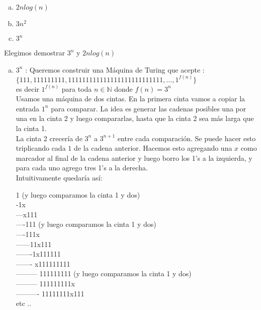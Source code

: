 \documentclass[12pt,letterpaper]{article}
\begin{document}
\begin{enumerate}[a.]
    \item $2n log(n)$ 
    \item $3n^2$
    \item $3^n$
\end{enumerate}

Elegimos demostrar $3^{n}$ y $2n log(n)$

    \begin{enumerate}[a.]
       
        \item $3^n$ : Queremos construir una Máquina de Turing que acepte : \\
        
        $\{111, 111111111, 111111111111111111111111111, ..., 1^{f(n)}\}  $ \\
        
        es decir $1^{f(n)}$ para toda $n\in \mathbb{N}$ donde $f(n)=3^n$ \\

Usamos una máquina de dos cintas. En la primera cinta vamos a copiar la entrada $1^{n}$ para comparar. La idea es generar las cadenas posibles una por una en la cinta 2 y luego compararlas, hasta que la cinta 2 sea más larga que la cinta 1.\\

La cinta 2 crecería de $3^n$ a $3^{n+1}$ entre cada comparación. Se puede hacer esto triplicando cada $1$ de la cadena anterior. Hacemos esto agregando una $x$ como marcador al final de la cadena anterior y luego borro los 1's a la izquierda, y para cada uno agrego tres 1's a la derecha.\\

Intuitivamente quedaría así: 

1 (y luego comparamos la cinta 1 y dos) \\ 
-1x\\
—x111\\
—-111  (y luego comparamos la cinta 1 y dos) \\ 
—-111x\\
——11x111\\
——-1x111111\\
——- x111111111\\
——— 111111111  (y luego comparamos la cinta 1 y dos) \\
——— 111111111x\\
———- 11111111x111\\
etc ..        \\


\end{enumerate}
\end{document}
